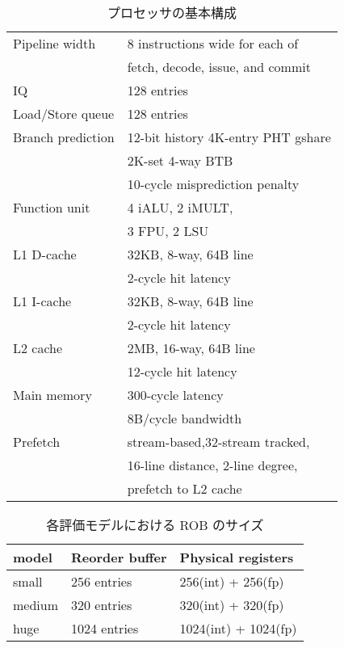 \documentclass[twocolumn]{jsarticle}
\begin{document}
  \begin{table}[htb]
    \caption{プロセッサの基本構成}
    \footnotesize
    \center
      \begin{tabular}{l|l} \hline \hline
       Pipeline width & 8 instructions wide for each of \\
       & fetch, decode, issue, and commit \\
       IQ & 128 entries \\
       Load/Store queue & 128 entries \\
       Branch prediction & 12-bit history 4K-entry PHT gshare \\
       & 2K-set 4-way BTB \\
       & 10-cycle misprediction penalty \\
       Function unit & 4 iALU, 2 iMULT, \\
       &  3 FPU, 2 LSU \\
       L1 D-cache & 32KB, 8-way, 64B line \\
        & 2-cycle hit latency \\
       L1 I-cache & 32KB, 8-way, 64B line \\
        &  2-cycle hit latency \\
       L2 cache & 2MB, 16-way, 64B line \\
        & 12-cycle hit latency \\  
       Main memory & 300-cycle latency \\
       & 8B/cycle bandwidth \\ 
       Prefetch & stream-based,32-stream tracked,  \\ 
       & 16-line distance, 2-line degree, \\
       & prefetch to L2 cache \\ \hline
    \end{tabular}
    \label{tab:base_config}
  \end{table}

  \begin{table}[htb]
    \caption{各評価モデルにおける ROB のサイズ}
    \footnotesize
    \center
      \begin{tabular}{l|l|l} \hline \hline
      model & Reorder buffer & Physical registers \\ \hline
      small & 256 entries & 256(int) + 256(fp) \\
      medium & 320 entries & 320(int) + 320(fp) \\
      huge & 1024 entries & 1024(int) + 1024(fp) \\ \hline
    \end{tabular}
    \label{tab:rob_size}
  \end{table}
\end{document}
